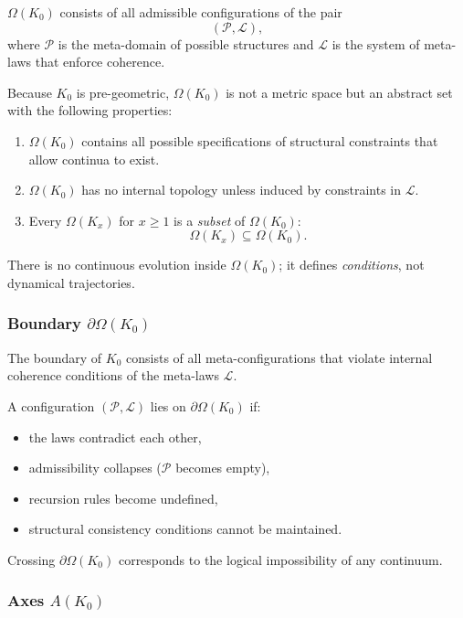 $\Omega(K_0)$ consists of all admissible configurations of the pair
\[
(\mathcal{P}, \mathcal{L}),
\]
where $\mathcal{P}$ is the meta-domain of possible structures and
$\mathcal{L}$ is the system of meta-laws that enforce coherence.

Because $K_0$ is pre-geometric, $\Omega(K_0)$ is not a metric space but
an abstract set with the following properties:
\begin{enumerate}
    \item $\Omega(K_0)$ contains all possible specifications of
          structural constraints that allow continua to exist.
    \item $\Omega(K_0)$ has no internal topology unless induced by
          constraints in $\mathcal{L}$.
    \item Every $\Omega(K_x)$ for $x \ge 1$ is a \emph{subset} of
          $\Omega(K_0)$:
          \[
              \Omega(K_x) \subseteq \Omega(K_0).
          \]
\end{enumerate}

There is no continuous evolution inside $\Omega(K_0)$; it defines
\emph{conditions}, not dynamical trajectories.

\subsubsection{Boundary \texorpdfstring{$\partial\Omega(K_0)$}{\partial\Omega(K_0)}}

The boundary of $K_0$ consists of all meta-configurations that violate
internal coherence conditions of the meta-laws $\mathcal{L}$.

A configuration $(\mathcal{P},\mathcal{L})$ lies on $\partial\Omega(K_0)$ if:
\begin{itemize}
    \item the laws contradict each other,
    \item admissibility collapses ($\mathcal{P}$ becomes empty),
    \item recursion rules become undefined,
    \item structural consistency conditions cannot be maintained.
\end{itemize}

Crossing $\partial\Omega(K_0)$ corresponds to the logical impossibility 
of any continuum.

\subsubsection{Axes \texorpdfstring{$A(K_0)$}{A(K_0)}}

